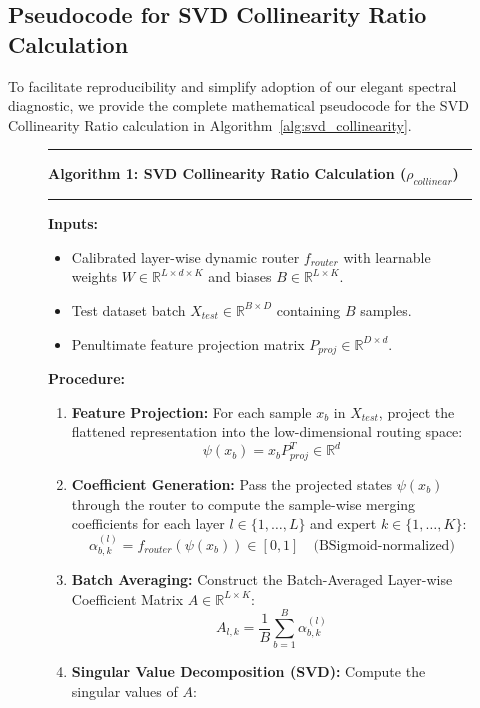 \subsection{Pseudocode for SVD Collinearity Ratio Calculation}
\label{app:svd_pseudocode}

To facilitate reproducibility and simplify adoption of our elegant spectral diagnostic, we provide the complete mathematical pseudocode for the SVD Collinearity Ratio calculation in Algorithm~\ref{alg:svd_collinearity}.

\begin{figure}[H]
\begin{center}
\begin{minipage}{0.9\textwidth}
\hrule
\vspace{4pt}
\textbf{Algorithm 1: SVD Collinearity Ratio Calculation ($\rho_{collinear}$)}
\vspace{4pt}
\hrule
\vspace{6pt}
\textbf{Inputs:}
\begin{itemize}
    \item Calibrated layer-wise dynamic router $f_{router}$ with learnable weights $W \in \mathbb{R}^{L \times d \times K}$ and biases $B \in \mathbb{R}^{L \times K}$.
    \item Test dataset batch $X_{test} \in \mathbb{R}^{B \times D}$ containing $B$ samples.
    \item Penultimate feature projection matrix $P_{proj} \in \mathbb{R}^{D \times d}$.
\end{itemize}
\textbf{Procedure:}
\begin{enumerate}
    \item \textbf{Feature Projection:} For each sample $x_b$ in $X_{test}$, project the flattened representation into the low-dimensional routing space:
    $$\psi(x_b) = x_b P_{proj}^T \in \mathbb{R}^d$$
    \item \textbf{Coefficient Generation:} Pass the projected states $\psi(x_b)$ through the router to compute the sample-wise merging coefficients for each layer $l \in \{1, \dots, L\}$ and expert $k \in \{1, \dots, K\}$:
    $$\alpha_{b, k}^{(l)} = f_{router}(\psi(x_b)) \in [0, 1] \quad \text{(BSigmoid-normalized)}$$
    \item \textbf{Batch Averaging:} Construct the Batch-Averaged Layer-wise Coefficient Matrix $A \in \mathbb{R}^{L \times K}$:
    $$A_{l, k} = \frac{1}{B} \sum_{b=1}^B \alpha_{b, k}^{(l)}$$
    \item \textbf{Singular Value Decomposition (SVD):} Compute the singular values of $A$:

\end{enumerate}
\end{minipage}
\end{center}
\end{figure}
